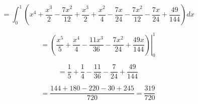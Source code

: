 \documentclass[fleqn]{article}
\begin{document}
\begin{enumerate}[nolistsep]
		\begin{equation*}
			= \int_{0}^{1}{\left(x^4 + \frac{x^3}{2} - \frac{7x^2}{12} + \frac{x^3}{2} + \frac{x^2}{4} - \frac{7x}{24} - \frac{7x^2}{12} - \frac{7x}{24} + \frac{49}{144}\right)dx}
		\end{equation*}
		
		\begin{equation*}
			= \left.\left(\frac{x^5}{5} + \frac{x^4}{4} - \frac{11x^3}{36} - \frac{7x^2}{24} + \frac{49x}{144}\right)\right\vert_{0}^{1}
		\end{equation*}
		
		\begin{equation*}
			= \frac{1}{5} + \frac{1}{4} - \frac{11}{36} - \frac{7}{24} + \frac{49}{144}
		\end{equation*}
		
		\begin{equation*}
			 = \frac{144 + 180 - 220 - 30 + 245}{720} = \frac{319}{720}
		\end{equation*}
	\end{enumerate}
\end{document}
